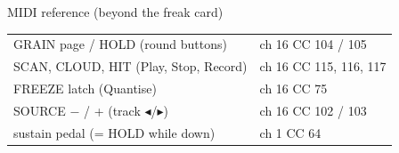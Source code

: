 \documentclass{article}
\begin{document}
\begin{minipage}[t]{112mm}
\begin{card}{MIDI reference (beyond the freak card)}
\fontsize{7.4}{9.0}\selectfont
\setlength{\tabcolsep}{3pt}
\begin{tabular}{@{}l l@{}}
GRAIN page / HOLD (round buttons) & ch 16 CC 104 / 105 \\
SCAN, CLOUD, HIT (Play, Stop, Record) & ch 16 CC 115, 116, 117 \\
FREEZE latch (Quantise) & ch 16 CC 75 \\
SOURCE \(-\) / + (track \(\blacktriangleleft\)/\(\blacktriangleright\)) & ch 16 CC 102 / 103 \\
sustain pedal (= HOLD while down) & ch 1 CC 64 \\
\end{tabular}
\end{card}
\end{minipage}
\end{document}
